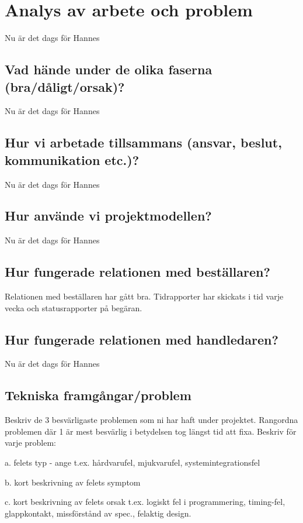 \documentclass[a4paper,titlepage,12pt]{article}
\begin{document}
	\section{Analys av arbete och problem}
	Nu är det dags för Hannes
	
	\subsection{Vad hände under de olika faserna (bra/dåligt/orsak)?}
	Nu är det dags för Hannes
	
	\subsection{Hur vi arbetade tillsammans (ansvar, beslut, kommunikation etc.)?}
	Nu är det dags för Hannes
	
	\subsection{Hur använde vi projektmodellen?}
	Nu är det dags för Hannes
	
	\subsection{Hur fungerade relationen med beställaren?}
    Relationen med beställaren har gått bra. Tidrapporter har skickats i tid
    varje vecka och statusrapporter på begäran. 
	
	\subsection{Hur fungerade relationen med handledaren?}
	Nu är det dags för Hannes
	
	\subsection{Tekniska framgångar/problem}
	Beskriv de 3 besvärligaste problemen som ni har haft under projektet. 
	Rangordna problemen där 1 är mest besvärlig i betydelsen tog längst tid att fixa.
	Beskriv för varje problem:

	a. felets typ - ange t.ex.  hårdvarufel, mjukvarufel, systemintegrationsfel 

	b. kort beskrivning av felets symptom 

	c. kort beskrivning av felets orsak t.ex. logiskt fel i programmering, timing-fel, glappkontakt, missförstånd av spec., felaktig design. 
\end{document}
